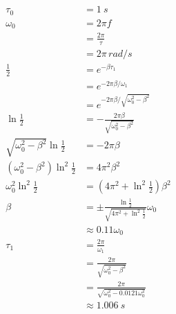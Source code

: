 \documentclass{article}
\begin{document}
\setcounter{subsection}{28}
\subsection{}

\begin{align*}
  \tau_0                                      & = \qty{1}{s}                                                              \\
  \omega_0                                    & = 2 \pi f                                                                 \\
                                              & = \frac{2 \pi}{\tau}                                                      \\
                                              & = 2 \pi \,\unit{rad/s}                                                    \\
  \frac{1}{2}                                 & = e^{-\beta \tau_1}                                                       \\
                                              & = e^{-2 \pi \beta / \omega_1}                                             \\
                                              & = e^{-2 \pi \beta / \sqrt{\omega_0^2 - \beta^2}}                          \\
  \ln \frac{1}{2}                             & = -\frac{2 \pi \beta}{\sqrt{\omega_0^2 - \beta^2}}                        \\
  \sqrt{\omega_0^2 - \beta^2} \ln \frac{1}{2} & = -2 \pi \beta                                                            \\
  (\omega_0^2 - \beta^2) \ln^2 \frac{1}{2}    & = 4 \pi^2 \beta^2                                                         \\
  \omega_0^2 \ln^2 \frac{1}{2}                & = \left( 4 \pi^2 + \ln^2 \frac{1}{2} \right) \beta^2                      \\
  \beta                                       & = \pm \frac{\ln \frac{1}{2}}{\sqrt{4 \pi^2 + \ln^2 \frac{1}{2}}} \omega_0 \\
                                              & \approx 0.11 \omega_0                                                     \\
  \tau_1                                      & = \frac{2 \pi}{\omega_1}                                                  \\
                                              & = \frac{2 \pi}{\sqrt{\omega_0^2 - \beta^2}}                               \\
                                              & = \frac{2 \pi}{\sqrt{\omega_0^2 - 0.0121 \omega_0^2}}                     \\
                                              & \approx \qty{1.006}{s}
\end{align*}
\end{document}
